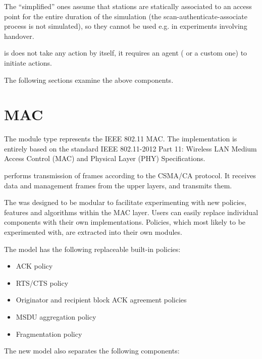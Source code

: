 The ``simplified'' ones assume that stations are statically associated to an
access point for the entire duration of the simulation (the
scan-authenticate-associate process is not simulated), so they cannot be used
e.g. in experiments involving handover.

 is does not take any action by itself, it requires an agent
( or a custom one) to initiate actions.


The following sections examine the above components.

\section{MAC}
\label{sec:80211:mac}

The  module type represents the IEEE 802.11 MAC.
The implementation is entirely based on the standard IEEE 802.11-2012 Part 11:
Wireless LAN Medium Access Control (MAC) and Physical Layer (PHY)
Specifications.

 performs transmission of frames according
to the CSMA/CA protocol. It receives data and management frames from
the upper layers, and transmits them.

The  was designed to be modular to facilitate experimenting
with new policies, features and algorithms within the MAC layer. Users can
easily replace individual components with their own implementations. Policies,
which most likely to be experimented with, are extracted into their own modules.

The model has the following replaceable built-in policies:

\begin{itemize}
  \item ACK policy
  \item RTS/CTS policy
  \item Originator and recipient block ACK agreement policies
  \item MSDU aggregation policy
  \item Fragmentation policy
\end{itemize}

The new model also separates the following components:

